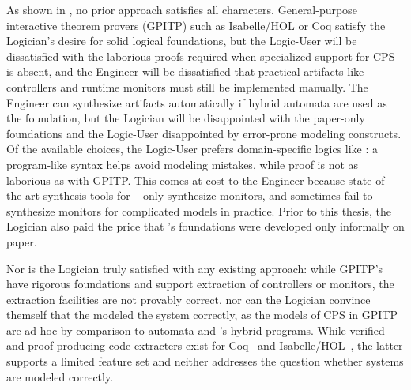 \documentclass[12pt]{cmuthesis}
\theoremstyle{definition}
\theoremstyle{remark}
\newcommand{\rref}[2][]{\prettyref{#2}}
\newcommand{\Isabelle}{Isabelle/HOL\xspace}
\newcommand{\Coq}{Coq\xspace}
\begin{document}
As shown in \rref{tab:approach-comparison}, no prior approach satisfies all characters.
General-purpose interactive theorem provers (GPITP) such as \Isabelle or \Coq satisfy the Logician's desire for solid logical foundations,
but the Logic-User will be dissatisfied with the laborious proofs required when specialized support for CPS is absent, 
and the Engineer will be dissatisfied that practical artifacts like controllers and runtime monitors must still be implemented manually.
The Engineer can synthesize artifacts automatically if hybrid automata are used as the foundation, but the Logician will be disappointed with the paper-only foundations and the Logic-User disappointed by error-prone modeling constructs.
Of the available choices, the Logic-User prefers domain-specific logics like \dL: a program-like syntax helps avoid modeling mistakes, while proof is not as laborious as with GPITP.
This comes at cost to the Engineer because state-of-the-art synthesis tools for \dL~\cite{DBLP:journals/fmsd/MitschP16} only synthesize monitors, and sometimes fail to synthesize monitors for complicated models in practice.
Prior to this thesis, the Logician also paid the price that \dL's foundations were developed only informally on paper.

Nor is the Logician truly satisfied with any existing approach: while GPITP's have rigorous foundations and support extraction of controllers or monitors, the extraction facilities are not provably correct, nor can the Logician convince themself that the modeled the system correctly, as the models of CPS in GPITP are ad-hoc by comparison to automata and \dL's hybrid programs.
While verified and proof-producing code extracters exist for Coq~\cite{anand2017certicoq} and \Isabelle~\cite{DBLP:conf/esop/HupelN18}, the latter supports a limited feature set and neither addresses the question whether systems are modeled correctly.
\end{document}
